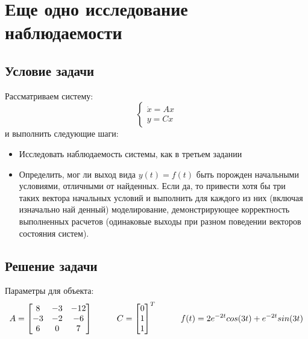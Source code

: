 \chapter{Еще одно исследование наблюдаемости}
\label{ch:chap4}

\section{Условие задачи}

Рассматриваем систему:
$$
  \begin{cases}
    \dot{x} = Ax \\
    y = Cx
  \end{cases}
$$ и выполнить следующие шаги:
    
    \begin{itemize}
    \item Исследовать наблюдаемость системы, как в третьем задании
    \item  Определить, мог ли выход вида $y(t) = f(t)$ быть порожден начальными условиями, 
    отличными от найденных. Если да, то привести хотя бы три таких вектора
    начальных условий и выполнить для каждого из них (включая изначально най
    денный) моделирование, демонстрирующее корректность выполненных расчетов
    (одинаковые выходы при разном поведении векторов состояния систем).
    
    
    \end{itemize}


\section{Решение задачи}

Параметры для объекта:
$$
  A = \begin{bmatrix}
    8   &	-3	&  -12 \\
    -3   &   -2  &  -6 \\
    6  &    0  &  7
  \end{bmatrix} \hspace*{1cm}
  C = \begin{bmatrix}
    0\\1\\1
  \end{bmatrix}^T \hspace*{1cm}
  f(t) = 2e^{-2t}cos(3t) + e^{-2t}sin(3t)
$$



